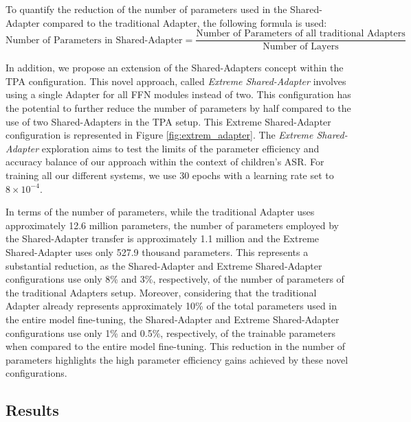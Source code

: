 To quantify the reduction of the number of parameters used in the Shared-Adapter compared to the traditional Adapter, the following formula is used:
\begin{equation}
    \text{Number of Parameters in Shared-Adapter} = \frac{\text{Number of Parameters of all traditional Adapters}}{\text{Number of Layers}}
\end{equation}

In addition, we propose an extension of the Shared-Adapters concept within the \ac{TPA} configuration. This novel approach, called \textit{Extreme Shared-Adapter} involves using a single Adapter for all \ac{FFN} modules instead of two. This configuration has the potential to further reduce the number of parameters by half compared to the use of two Shared-Adapters in the \ac{TPA} setup. This Extreme Shared-Adapter configuration is represented in Figure \ref{fig:extrem_adapter}. The \textit{Extreme Shared-Adapter} exploration aims to test the limits of the parameter efficiency and accuracy balance of our approach within the context of children's \ac{ASR}. For training all our different systems, we use 30 epochs with a learning rate set to $8 \times 10^{-4}$.

In terms of the number of parameters, while the traditional Adapter uses approximately 12.6 million parameters, the number of parameters employed by the Shared-Adapter transfer is approximately 1.1 million and the Extreme Shared-Adapter uses only 527.9 thousand parameters. This represents a substantial reduction, as the Shared-Adapter and Extreme Shared-Adapter configurations use only 8\% and 3\%, respectively, of the number of parameters of the traditional Adapters setup. Moreover, considering that the traditional Adapter already represents approximately 10\% of the total parameters used in the entire model fine-tuning, the Shared-Adapter and Extreme Shared-Adapter configurations use only 1\% and 0.5\%, respectively, of the trainable parameters when compared to the entire model fine-tuning. This reduction in the number of parameters highlights the high parameter efficiency gains achieved by these novel configurations.

\subsection{Results}
